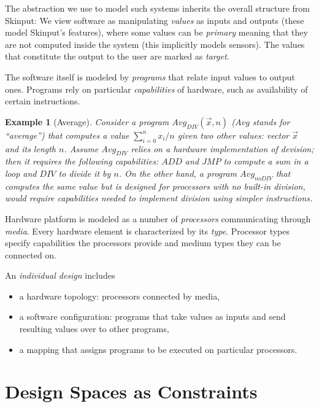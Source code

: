 \documentclass[conference]{IEEEtran}
\newtheorem{exmp}{Example}[section]
\begin{document}
The abstraction we use to model such systems inherits the overall structure from Skinput: We view software as manipulating \emph{values} as inputs and outputs (these model Skinput's features), where some values can be \emph{primary} meaning that they are not computed inside the system (this implicitly models sensors). The values that constitute the output to the user are marked as \emph{target}. 

The software itself is modeled by \emph{programs} that relate input values to output ones. Programs rely on particular \emph{capabilities} of hardware, such as availability of certain instructions.

\begin{exmp}[Average] Consider a program $Avg_{DIV}(\overrightarrow{x}, n)$ ($Avg$ stands for ``average'') that computes a value $\sum\limits_{i=0}^n x_i / n$ given two other values: vector $\overrightarrow{x}$ and its length $n$. Assume $Avg_{DIV}$ relies on a hardware implementation of devision; then it requires the following capabilities: $ADD$ and $JMP$ to compute a sum in a loop and $DIV$ to divide it by $n$. On the other hand, a program $Avg_{noDIV}$ that computes the same value but is designed for processors with no built-in division, would require capabilities needed to implement division using simpler instructions.
\end{exmp}

Hardware platform is modeled as a number of \emph{processors} communicating through \emph{media}. Every hardware element is characterized by its \emph{type}. Processor types specify capabilities the processors provide and medium types they can be connected on.

An \emph{individual design} includes 
\begin{itemize}
\item a hardware topology: processors connected by media,
\item a software configuration: programs that take values as inputs and send resulting values over to other programs,
\item a mapping that assigns programs to be executed on particular processors.
\end{itemize}

\section{Design Spaces as Constraints}

\newcommand{\DataSig}{\Sigma}
\newcommand{\FreeCons}{F}
\newcommand{\Consts}{C}
\newcommand{\Vars}{V}
\end{document}
